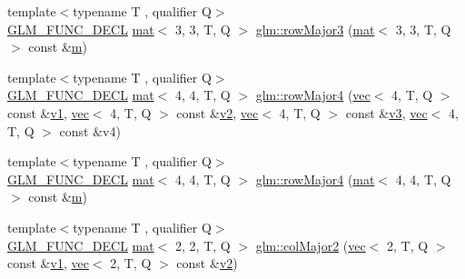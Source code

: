 \begin{DoxyCompactItemize}
\item 
{\footnotesize template$<$typename T , qualifier Q$>$ }\\\mbox{\hyperlink{setup_8hpp_ab2d052de21a70539923e9bcbf6e83a51}{G\+L\+M\+\_\+\+F\+U\+N\+C\+\_\+\+D\+E\+CL}} \mbox{\hyperlink{structglm_1_1mat}{mat}}$<$ 3, 3, T, Q $>$ \mbox{\hyperlink{group__gtx__matrix__major__storage_gad8a3a50ab47bbe8d36cdb81d90dfcf77}{glm\+::row\+Major3}} (\mbox{\hyperlink{structglm_1_1mat}{mat}}$<$ 3, 3, T, Q $>$ const \&\mbox{\hyperlink{_s_d_l__opengl__glext_8h_af593500c283bf1a787a6f947f503a5c2}{m}})
\item 
{\footnotesize template$<$typename T , qualifier Q$>$ }\\\mbox{\hyperlink{setup_8hpp_ab2d052de21a70539923e9bcbf6e83a51}{G\+L\+M\+\_\+\+F\+U\+N\+C\+\_\+\+D\+E\+CL}} \mbox{\hyperlink{structglm_1_1mat}{mat}}$<$ 4, 4, T, Q $>$ \mbox{\hyperlink{group__gtx__matrix__major__storage_ga9636cd6bbe2c32a8d0c03ffb8b1ef284}{glm\+::row\+Major4}} (\mbox{\hyperlink{structglm_1_1vec}{vec}}$<$ 4, T, Q $>$ const \&\mbox{\hyperlink{_s_d_l__opengl__glext_8h_a435c176a02c061b43e19bdf7c86cceae}{v1}}, \mbox{\hyperlink{structglm_1_1vec}{vec}}$<$ 4, T, Q $>$ const \&\mbox{\hyperlink{_s_d_l__opengl__glext_8h_a0928f6d0f0f794ba000a21dfae422136}{v2}}, \mbox{\hyperlink{structglm_1_1vec}{vec}}$<$ 4, T, Q $>$ const \&\mbox{\hyperlink{_s_d_l__opengl__glext_8h_acc806b31cbf466ceba6555983d8b814d}{v3}}, \mbox{\hyperlink{structglm_1_1vec}{vec}}$<$ 4, T, Q $>$ const \&v4)
\item 
{\footnotesize template$<$typename T , qualifier Q$>$ }\\\mbox{\hyperlink{setup_8hpp_ab2d052de21a70539923e9bcbf6e83a51}{G\+L\+M\+\_\+\+F\+U\+N\+C\+\_\+\+D\+E\+CL}} \mbox{\hyperlink{structglm_1_1mat}{mat}}$<$ 4, 4, T, Q $>$ \mbox{\hyperlink{group__gtx__matrix__major__storage_gac92ad1c2acdf18d3eb7be45a32f9566b}{glm\+::row\+Major4}} (\mbox{\hyperlink{structglm_1_1mat}{mat}}$<$ 4, 4, T, Q $>$ const \&\mbox{\hyperlink{_s_d_l__opengl__glext_8h_af593500c283bf1a787a6f947f503a5c2}{m}})
\item 
{\footnotesize template$<$typename T , qualifier Q$>$ }\\\mbox{\hyperlink{setup_8hpp_ab2d052de21a70539923e9bcbf6e83a51}{G\+L\+M\+\_\+\+F\+U\+N\+C\+\_\+\+D\+E\+CL}} \mbox{\hyperlink{structglm_1_1mat}{mat}}$<$ 2, 2, T, Q $>$ \mbox{\hyperlink{group__gtx__matrix__major__storage_gaaff72f11286e59a4a88ed21a347f284c}{glm\+::col\+Major2}} (\mbox{\hyperlink{structglm_1_1vec}{vec}}$<$ 2, T, Q $>$ const \&\mbox{\hyperlink{_s_d_l__opengl__glext_8h_a435c176a02c061b43e19bdf7c86cceae}{v1}}, \mbox{\hyperlink{structglm_1_1vec}{vec}}$<$ 2, T, Q $>$ const \&\mbox{\hyperlink{_s_d_l__opengl__glext_8h_a0928f6d0f0f794ba000a21dfae422136}{v2}})

\end{DoxyCompactItemize}

